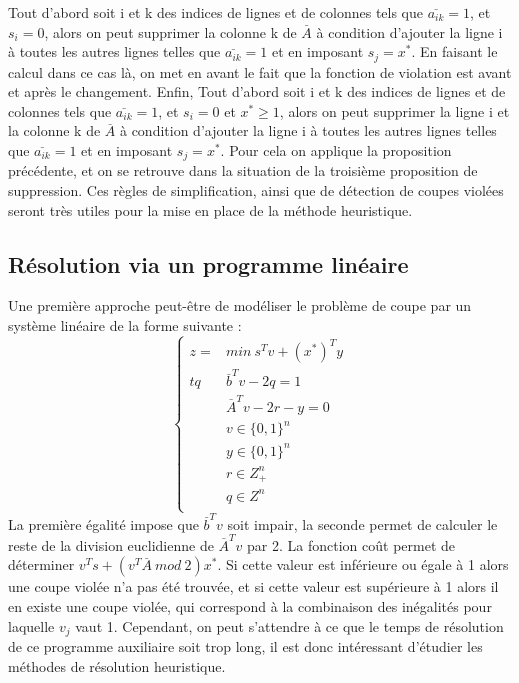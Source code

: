 \documentclass[12pt]{report}
\begin{document}
Tout d'abord soit i et k des indices de lignes et de colonnes tels que $\overset{\_}{a_{ik}}=1$, et $s_i=0$, alors on peut supprimer la colonne k de $\overset{\_}{A}$ à condition d'ajouter la ligne i à toutes les autres lignes telles que $\overset{\_}{a_{ik}}=1$ et en imposant $s_j=x^\ast$.
En faisant le calcul dans ce cas là, on met en avant le fait que la fonction de violation est avant et après le changement.
\newline
Enfin, Tout d'abord soit i et k des indices de lignes et de colonnes tels que $\overset{\_}{a_{ik}}=1$, et $s_i=0$ et $x^\ast \ge 1$, alors on peut supprimer la ligne i et la colonne k de $\overset{\_}{A}$ à condition d'ajouter la ligne i à toutes les autres lignes telles que $\overset{\_}{a_{ik}}=1$ et en imposant $s_j=x^\ast$. Pour cela on applique la proposition précédente, et on se retrouve dans la situation de la troisième proposition de suppression.
\newline
\newline
Ces règles de simplification, ainsi que de détection de coupes violées seront très utiles pour la mise en place de la méthode heuristique. 

\subsection{Résolution via un programme linéaire}
Une première approche peut-être de modéliser le problème de coupe par un système linéaire de la forme suivante :
$$
\left\{
    \begin{array}{ll}
        z=&min \ s^Tv+(x^\ast)^Ty \\
        tq &  \overset{\_}{b}^Tv-2q=1 \\
          & \overset{\_}{A}^Tv-2r-y=0 \\
          & v \in \{0,1\}^n \\
          & y \in \{0,1\}^n \\
          & r \in Z^n_+ \\
          & q \in Z^n \\
    \end{array}
\right.
$$
La première égalité impose que $\overset{\_}{b}^Tv$ soit impair, la seconde permet de calculer le reste de la division euclidienne de $\overset{\_}{A}^Tv$ par 2. La fonction coût permet de déterminer $v^Ts+(v^T\overset{\_}{A}\ mod\ 2)x^\ast$. Si cette valeur est inférieure ou égale à 1 alors une coupe violée n'a pas été trouvée, et si cette valeur est supérieure à 1 alors il en existe une coupe violée, qui correspond à la combinaison des inégalités pour laquelle $v_j$ vaut 1.
Cependant, on peut s'attendre à ce que le temps de résolution de ce programme auxiliaire soit trop long, il est donc intéressant d'étudier les méthodes de résolution heuristique.
\end{document}
